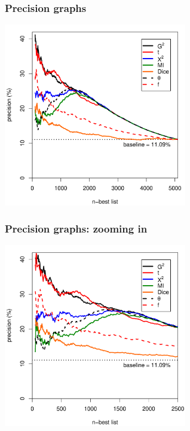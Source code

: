 \documentclass[handout,notes=show,t]{beamer} %
\begin{document}
\begin{frame}
  \frametitle{Precision graphs}

  \begin{center}
    \includegraphics[width=8cm]{img/mwe_eval_1}
  \end{center}
\end{frame}

\begin{frame}
  \frametitle{Precision graphs: zooming in}

  \begin{center}
    \includegraphics[width=8cm]{img/mwe_eval_2}
  \end{center}
\end{frame}
\end{document}
